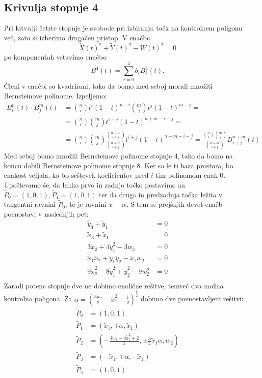 \documentclass[a4paper,12pt]{article}
\begin{document}
\subsection{Krivulja stopnje 4}
Pri krivulji četrte stopnje je svobode pri izbiranju točk na kontrolnem poligonu več, zato si izberimo drugačen pristop. V enačbo $$\tilde{X}(t)^2 + \tilde{Y}(t)^2 - W(t)^2 = 0$$ po komponentah vstavimo enačbo $$B^4(t) = \sum_{i=0}^4b_iB_i^4(t).$$
\noindent
Členi v enačbi so kvadrirani, tako da bomo med seboj morali množiti Bernsteinove polinome. Izpeljemo:
\begin{align*}
B_{i}^{n}(t) \cdot B_{j}^{m}(t) &= \binom{n}{i} t^i (1-t)^{n-i} \binom{m}{j} t^j (1-t)^{m-j} = \\
& = \binom{n}{i} \binom{m}{j} t^{i+j} (1-t)^{n+m-i-j} = \\ 
&=\binom{n}{i}\binom{m}{j} \frac{\binom{n+m}{i+j}}{\binom{n+m}{i+j}} t^{i+j}(1-t)^{n+m-i-j} = \frac{\binom{n}{i}\binom{m}{j}}{\binom{n+m}{i+j}} B_{i+j}^{n+m}(t)
\end{align*}
Med seboj bomo množili Bernsteinove polinome stopnje 4, tako da bomo na koncu dobili Bernsteinove polinome stopnje 8. Ker so le ti baza prostora, bo enakost veljala, ko bo seštevek koeficientov pred $i$-tim polinomom enak 0. Upoštevamo še, da lahko prvo in zadnjo točko postavimo na $\tilde{P}_0 = (1,0, 1), \tilde{P}_4 = (1,0, 1)$ ter da druga in predzadnja točka ležita v tangentni ravnini $\tilde{P}_0$, to je ravnini $x = w$. S tem se prejšnjih devet enačb poenostavi v naslednjih pet:
\begin{align*}
\tilde{y}_3 + \tilde{y}_1 &= 0\\
\tilde{x}_3 + \tilde{x}_1 &= 0\\
3\tilde{x}_2 + 4\tilde{y}_1^2 - 3w_3 &= 0 \\
\tilde{x}_1\tilde{x}_2 + \tilde{y}_1\tilde{y}_2  - \tilde{x}_1w_2 &= 0 \\
9\tilde{x}_2^2 - 8\tilde{y}_1^2 + \tilde{y}_2^2 - 9w_2^2&= 0 \\
\end{align*}
Zaradi potenc stopnje dve ne dobimo enolične rešitve, temveč dva možna kontrolna poligona. Za $\alpha = (\frac{3w_2}{2} - \tilde{x}_1^2 + \frac{1}{2})^{\frac{1}{2}}$ dobimo dve poenostavljeni rešitvi:
\begin{align*}
\tilde{P}_0 &= (1,0, 1)\\
\tilde{P}_1 &= (\tilde{x}_1, \pm \alpha,\tilde{x}_1)\\
\tilde{P}_2 &= (-\frac{3w_2 - 4\tilde{x}_1^2+2}{3}, \pm \frac{3}{4}\tilde{x}_1\alpha, w_2)\\
\tilde{P}_3 &= (-\tilde{x}_1, \mp \alpha,-\tilde{x}_1)\\
\tilde{P}_4 &= (1,0,1) \\
\end{align*}
\end{document}
